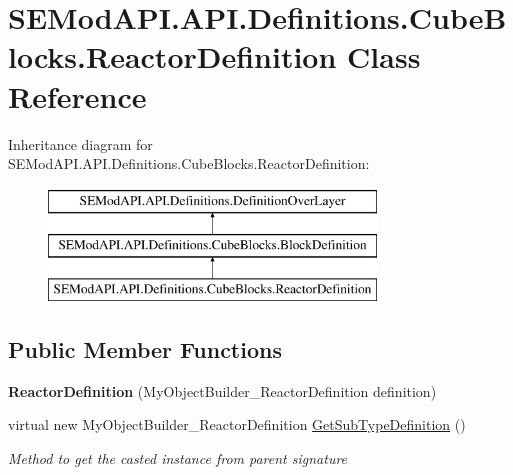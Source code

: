\hypertarget{class_s_e_mod_a_p_i_1_1_a_p_i_1_1_definitions_1_1_cube_blocks_1_1_reactor_definition}{}\section{S\+E\+Mod\+A\+P\+I.\+A\+P\+I.\+Definitions.\+Cube\+Blocks.\+Reactor\+Definition Class Reference}
\label{class_s_e_mod_a_p_i_1_1_a_p_i_1_1_definitions_1_1_cube_blocks_1_1_reactor_definition}
Inheritance diagram for S\+E\+Mod\+A\+P\+I.\+A\+P\+I.\+Definitions.\+Cube\+Blocks.\+Reactor\+Definition\+:\begin{figure}[H]
\begin{center}
\leavevmode
\includegraphics[height=3.000000cm]{class_s_e_mod_a_p_i_1_1_a_p_i_1_1_definitions_1_1_cube_blocks_1_1_reactor_definition}
\end{center}
\end{figure}
\subsection*{Public Member Functions}
\begin{DoxyCompactItemize}
\item 
\hypertarget{class_s_e_mod_a_p_i_1_1_a_p_i_1_1_definitions_1_1_cube_blocks_1_1_reactor_definition_ab40e0db3b328f7cca2f3c8711d021206}{}{\bfseries Reactor\+Definition} (My\+Object\+Builder\+\_\+\+Reactor\+Definition definition)\label{class_s_e_mod_a_p_i_1_1_a_p_i_1_1_definitions_1_1_cube_blocks_1_1_reactor_definition_ab40e0db3b328f7cca2f3c8711d021206}

\item 
virtual new My\+Object\+Builder\+\_\+\+Reactor\+Definition \hyperlink{class_s_e_mod_a_p_i_1_1_a_p_i_1_1_definitions_1_1_cube_blocks_1_1_reactor_definition_a72ab34528967716c5b3d521760b2b7d1}{Get\+Sub\+Type\+Definition} ()
\begin{DoxyCompactList}\small\item\em Method to get the casted instance from parent signature \end{DoxyCompactList}\end{DoxyCompactItemize}

